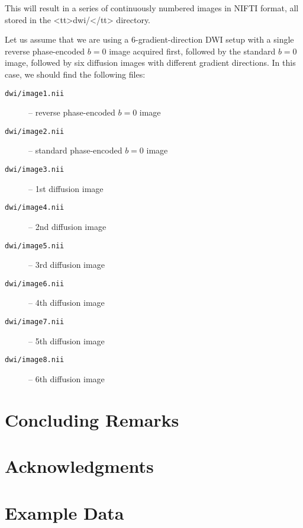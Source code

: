 \documentclass{InsightArticle}
\begin{document}
This will result in a series of continuously numbered images in NIFTI format,
all stored in the <tt>dwi/</tt> directory.

Let us assume that we are using a 6-gradient-direction DWI setup with a single
reverse phase-encoded $b=0$ image acquired first, followed by the standard
$b=0$ image, followed by six diffusion images with different gradient
directions. In this case, we should find the following files:
\begin{description}
\item[\tt dwi/image1.nii] -- reverse phase-encoded $b=0$ image
\item[\tt dwi/image2.nii] -- standard phase-encoded $b=0$ image
\item[\tt dwi/image3.nii] -- 1st diffusion image
\item[\tt dwi/image4.nii] -- 2nd diffusion image
\item[\tt dwi/image5.nii] -- 3rd diffusion image
\item[\tt dwi/image6.nii] -- 4th diffusion image
\item[\tt dwi/image7.nii] -- 5th diffusion image
\item[\tt dwi/image8.nii] -- 6th diffusion image
\end{description}

\section{Concluding Remarks}

\section*{Acknowledgments}




\clearpage
\appendix

\section{Example Data}
\end{document}
